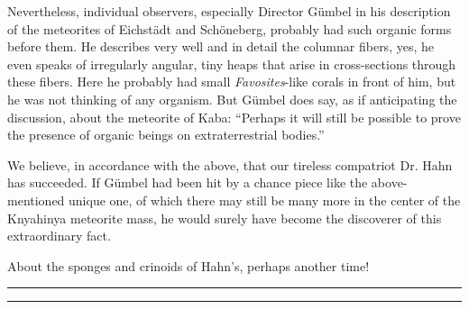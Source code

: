 \documentclass[a4paper, 12pt, oneside]{article}
\begin{document}
Nevertheless, individual observers, especially Director Gümbel in his description of the meteorites of Eichstädt and Schöneberg, probably had such organic forms before them. He describes very well and in detail the columnar fibers, yes, he even speaks of irregularly angular, tiny heaps that arise in cross-sections through these fibers. Here he probably had small \emph{Favosites}-like corals in front of him, but he was not thinking of any organism. But Gümbel does say, as if anticipating the discussion, about the meteorite of Kaba: ``Perhaps it will still be possible to prove the presence of organic beings on extraterrestrial bodies.''

We believe, in accordance with the above, that our tireless compatriot Dr. Hahn has succeeded. If Gümbel had been hit by a chance piece like the above-mentioned unique one, of which there may still be many more in the center of the Knyahinya meteorite mass, he would surely have become the discoverer of this extraordinary fact.

About the sponges and crinoids of Hahn's, perhaps another time!
\rule{\textwidth}{1.6pt}\vspace*{-\baselineskip}\vspace*{2pt} %
\rule{\textwidth}{0.4pt} %
\end{document}
